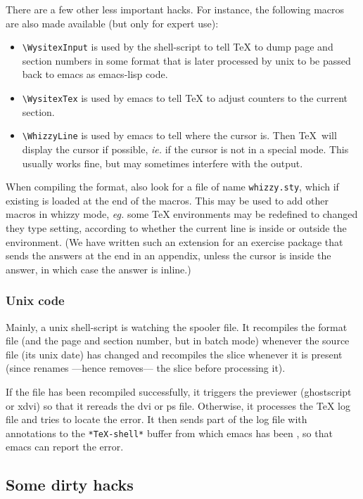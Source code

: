 \documentclass{article}
\let \lst \verb
\let \whizzy \WhizzyTeX
\begin{document}
There are a few other less important hacks. For instance, the following
macros are also made available (but only for expert use):
\begin {itemize}
\item
\lst"\WysitexInput" is used by the shell-script to tell {\TeX} to dump page
and section  numbers in some format that is later processed by unix to be
passed back to emacs as emacs-lisp code.
\item
\lst"\WysitexTex" is used by emacs to tell {\TeX} to adjust counters to
the current section. 
\item
\lst"\WhizzyLine" is used by emacs to tell where the cursor is.
Then \TeX\ will display the cursor if possible, {\em ie.} if the cursor is
not in a special mode. This usually works fine, but may sometimes interfere
with the output. 
\end {itemize}
When compiling the format, {\whizzy} also look for a file of name
\lst"whizzy.sty", which if existing is loaded at the end of the macros. 
This may be used to add other macros in {whizzy} mode, {\em eg.} 
some {\TeX} environments may be redefined to changed they type setting,
according to whether the current line is inside or outside the environment. 
(We have written such an extension for an exercise package that sends the
answers at the end in an appendix, unless the cursor is inside the answer,
in which case the answer is inline.)

\subsubsection* {Unix code}

Mainly, a unix shell-script is watching the spooler file.  It recompiles the
format file (and the page and section number, but in batch mode) whenever
the source file (its unix date) has changed  and 
recompiles the slice whenever it is present (since {\whizzy} renames ---hence
removes--- the slice before processing it).

If the file has been recompiled successfully, it triggers the previewer
(ghostscript or xdvi) so that it rereads the dvi or ps file. Otherwise, it
processes the {\TeX} log file and tries to locate the error. It then sends part
of the log file with annotations to the \lst"*TeX-shell*" buffer from which
emacs has been {\whizzy}, so that emacs can report the error. 


\subsection{Some dirty hacks}
\end{document}
